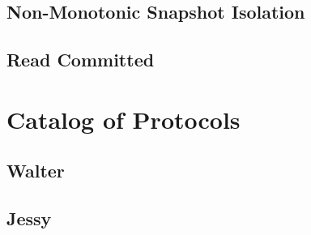 \subsection{Non-Monotonic Snapshot Isolation}
\subsection{Read Committed}

\section{Catalog of Protocols}
\subsection{Walter}
\subsection{Jessy}
